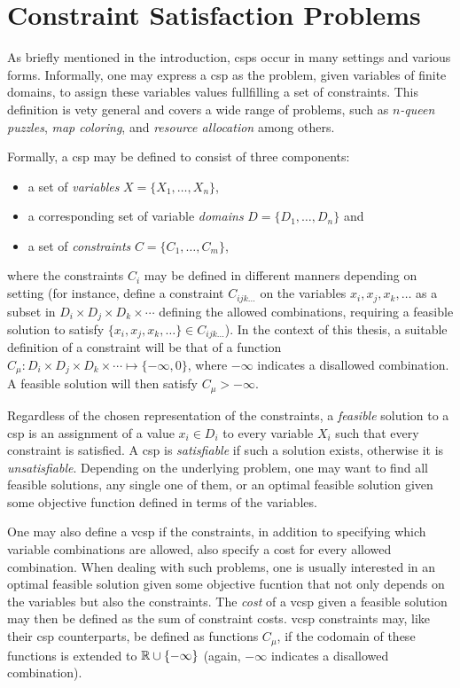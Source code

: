 \section{Constraint Satisfaction Problems}
As briefly mentioned in the introduction, \glspl{csp} occur in many settings and various forms.
Informally, one may express a \gls{csp} as the problem, given variables of finite domains, to assign these variables values fullfilling a set of constraints.
This definition is vety general and covers a wide range of problems, such as \emph{\(n\)-queen puzzles}, \emph{map coloring}, and \emph{resource allocation} among others.

Formally, a \gls{csp} may be defined to consist of three components:
\begin{itemize}
	\item a set of \emph{variables} \(X = \{X_1,\dotsc,X_n\}\),
	\item a corresponding set of variable \emph{domains} \(D = \{D_1,\dotsc,D_n\}\) and
	\item a set of \emph{constraints} \(C = \{C_1,\dotsc,C_m\}\),
\end{itemize}
where the constraints \(C_i\) may be defined in different manners depending on setting (for instance, \textcite[\pno~559]{Brailsford99} define a constraint \(C_{ijk\dotso}\) on the variables \(x_i,x_j,x_k,\dotsc\) as a subset in \(D_i\times D_j \times D_k \times \dotsm\) defining the allowed combinations, requiring a feasible solution to satisfy \(\{x_i,x_j,x_k,\dotsc\}\in C_{ijk\dotso}\)).
In the context of this thesis, a suitable definition of a constraint will be that of a function \(C_\mu: D_i\times D_j \times D_k \times \dotsm \mapsto \{-\infty,0\}\), where \(-\infty\) indicates a disallowed combination.
A feasible solution will then satisfy \(C_\mu > -\infty\).

Regardless of the chosen representation of the constraints, a \emph{feasible} solution to a \gls{csp} is an assignment of a value \(x_i\in D_i\) to every variable \(X_i\) such that every constraint is satisfied.
A \gls{csp} is \emph{satisfiable} if such a solution exists, otherwise it is \emph{unsatisfiable}.
Depending on the underlying problem, one may want to find all feasible solutions, any single one of them, or an optimal feasible solution given some objective function defined in terms of the variables.

One may also define a \gls{vcsp} if the constraints, in addition to specifying which variable combinations are allowed, also specify a cost for every allowed combination.
When dealing with such problems, one is usually interested in an optimal feasible solution given some objective fucntion that not only depends on the variables but also the constraints.
The \emph{cost} of a \gls{vcsp} given a feasible solution may then be defined as the sum of constraint costs.
\Gls{vcsp} constraints may, like their \gls{csp} counterparts, be defined as functions \(C_\mu\), if the codomain of these functions is extended to \(\mathbb{R}\cup\{-\infty\}\) (again, \(-\infty\) indicates a disallowed combination).

